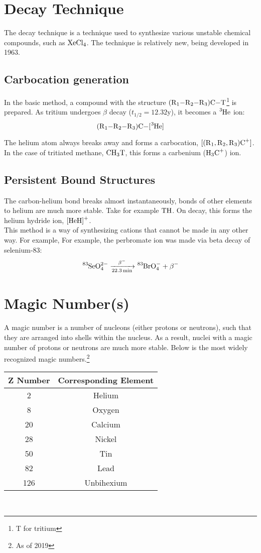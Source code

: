 \documentclass{article}
\begin{document}
\begin{multicols*}{2}
    \section{Decay Technique}
    The decay technique is a technique used to synthesize various unstable chemical
    compounds, such as $\ce{XeCl4}$. The technique is relatively new, being developed
    in 1963.

    \subsection{Carbocation generation}
    In the basic method, a compound with the structure $\ce{(R1-R2-R3)C-T}$\footnote{T for tritium}
    is prepared. As tritium undergoes $\beta$ decay ($t_{1/2} = 12.32$y), it becomes
    a $\ce{^{3}He}$ ion:
    \[
      \ce{(R1-R2-R3)C-[^{3}He]}
    \]

    The helium atom always breaks away and forms a carbocation, $\ce{[(R1,R2,R3)C+]}$.
    In the case of tritiated methane, $\ce{CH3T}$, this forms a carbenium ($\ce{H3C+}$) ion.

    \subsection{Persistent Bound Structures}
    The carbon-helium bond breaks almost instantaneously, bonds of other elements to helium
    are much more stable. Take for example $\ce{TH}$. On decay, this forms the
    helium hydride ion, $\ce{[HeH]+}$.\\

    This method is a way of synthesizing cations that cannot be made in any other way. For example,
    For example, the perbromate ion was made via beta decay of selenium-83:
    \[
      \ce{^{83}SeO^{2-}_{4} ->[\beta-][22.3min] ^{83}BrO^-_4 + \beta-}
    \]

    \section{Magic Number(s)}
    A magic number is a number of nucleons (either protons or neutrons), such that they
    are arranged into shells within the nucleus. As a result, nuclei with a magic number of
    protons or neutrons are much more stable. Below is the most widely recognized magic numbers.\footnote{As of 2019}
    
    \begin{tabular}{|c|c|}
      \hline
      \textbf{Z Number} & \textbf{Corresponding Element} \\
      \hline
      2   & Helium  \\
      8   & Oxygen  \\
      20  & Calcium \\
      28  & Nickel  \\
      50  & Tin     \\
      82  & Lead    \\
      126 & Unbihexium \\
      \hline
    \end{tabular}\\



\end{multicols*}
\end{document}
